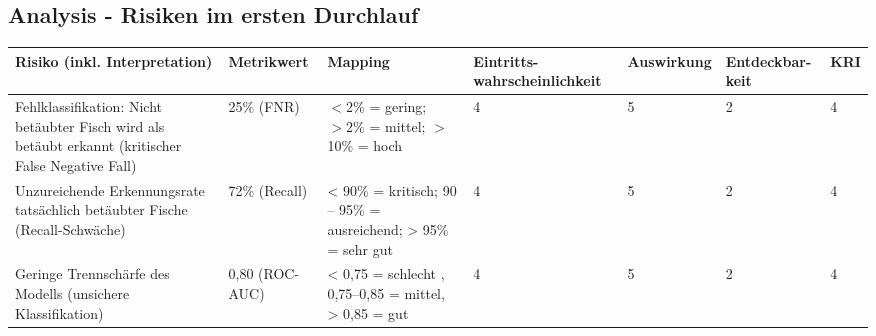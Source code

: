 
\clearpage %

\begin{landscape}
    \subsection{Analysis - Risiken im ersten Durchlauf} 
    \label{appendix:cs3_kri_mapping_1}

    \centering
    \begin{table}[H]
        \label{tab:cs3_phase3_kri_mapping_tabelle_1}
        \renewcommand{\arraystretch}{1.3}
        \begin{tabular}{|p{5cm} | p{2.5cm} | p{3cm} | p{3.5cm} | p{3cm} | p{2.5cm} | p{1.5cm} |}
        \hline
        \textbf{Risiko (inkl. Interpretation)} & \textbf{Metrikwert} & \textbf{Mapping} & \textbf{Eintritts-wahrscheinlichkeit} & \textbf{Auswirkung} & \textbf{Entdeckbar-keit} & \textbf{KRI} \\
        \hline

        Fehlklassifikation: Nicht betäubter Fisch wird als betäubt erkannt (kritischer False Negative Fall) 
        & 25\% (FNR) 
        & $<2\%$ = gering; $>2\%$ = mittel; $>$10\% = hoch
        & 4 
        & 5
        & 2 
        & 4 \\
        \hline

        Unzureichende Erkennungsrate tatsächlich betäubter Fische (Recall-Schwäche)
        & 72\% (Recall) 
        & < 90\% = kritisch; 90 -- 95\% = ausreichend; > 95\% = sehr gut
        & 4
        & 5 
        & 2 
        & 4 \\
        \hline

        Geringe Trennschärfe des Modells (unsichere Klassifikation)
        & 0{,}80 (ROC-AUC) 
        & < 0{,}75 = schlecht , 0{,}75--0{,}85 = mittel, > 0{,}85 = gut 
        & 4 
        & 5 
        & 2 
        & 4 \\

        \hline
        \end{tabular}
    \end{table}
\end{landscape}

